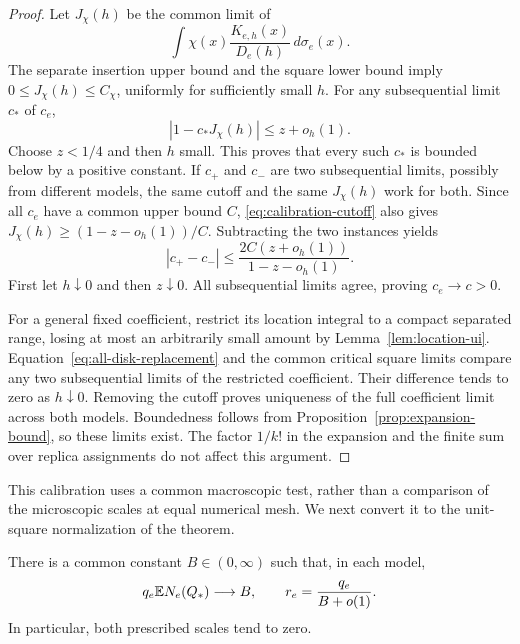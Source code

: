 \begin{proof}
Let $J_\chi(h)$ be the common limit of
\[
 \int\chi(x)\frac{K_{e,h}(x)}{D_e(h)}\,d\sigma_e(x).
\]
The separate insertion upper bound and the square lower bound imply
$0\le J_\chi(h)\le C_\chi$, uniformly for sufficiently small $h$.
For any subsequential limit $c_*$ of $c_e$,
\begin{equation}
 |1-c_*J_\chi(h)|\le z+o_h(1).
 \label{eq:calibration-cutoff}
\end{equation}
Choose $z<1/4$ and then $h$ small. This proves that every such $c_*$
is bounded below by a positive constant. If $c_+$ and $c_-$ are two
subsequential limits, possibly from different models, the same cutoff
and the same $J_\chi(h)$ work for both. Since all $c_e$ have a common
upper bound $C$, \eqref{eq:calibration-cutoff} also gives
$J_\chi(h)\ge(1-z-o_h(1))/C$. Subtracting the two instances yields
\[
 |c_+-c_-|\le
 \frac{2C(z+o_h(1))}{1-z-o_h(1)}.
\]
First let $h\downarrow0$ and then $z\downarrow0$.
All subsequential limits agree, proving $c_e\to c>0$.

For a general fixed coefficient, restrict its location integral to
a compact separated range, losing at most an arbitrarily small
amount by Lemma~\ref{lem:location-ui}. Equation~\eqref{eq:all-disk-replacement}
and the common critical square limits compare any two subsequential
limits of the restricted coefficient. Their difference tends to zero
as $h\downarrow0$. Removing the cutoff proves uniqueness of the full
coefficient limit across both models. Boundedness follows from
Proposition~\ref{prop:expansion-bound}, so these limits exist.
The factor $1/k!$ in the expansion and the finite sum over replica
assignments do not affect this argument.
\end{proof}

This calibration uses a common macroscopic test, rather than a
comparison of the microscopic scales at equal numerical mesh.
We next convert it to the unit-square normalization of the theorem.

\begin{lemma}
\label{lem:square-normalization}
There is a common constant $B\in(0,\infty)$ such that, in each model,
\begin{equation}
 q_e\mathbb E N_e(Q_*)\longrightarrow B,
 \qquad r_e=\frac{q_e}{B+o(1)}.
 \label{eq:square-normalization}
\end{equation}
In particular, both prescribed scales tend to zero.
\end{lemma}


